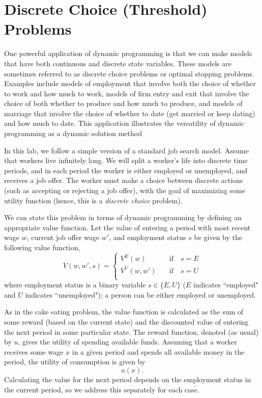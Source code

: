 \section*{Discrete Choice (Threshold) Problems}\label{SecDiscrChoice}

One powerful application of dynamic programming is that we can make 
models that have both continuous and discrete state variables. These models are sometimes referred to as
discrete choice problems or optimal stopping problems.  Examples include models of employment that involve both
the choice of whether to work and how much to work, models of firm entry and exit that involve the choice of both
whether to produce and how much to produce, and models of marriage that involve the choice of whether to date
(get married or keep dating) and how much to date.
This application illustrates the versatility of dynamic programming as a dynamic solution method

In this lab, we follow a simple version of a standard job search model.
Assume that workers live infinitely long.
We will split a worker's life into discrete time periods, and in each period the worker is either
employed or unemployed, and receives a job offer. The worker must make a choice between discrete actions
(such as accepting or rejecting a job offer), with the goal of maximizing some utility function (hence,
this is a \emph{discrete choice} problem).

We can state this problem in terms of dynamic programming by defining an appropriate value function.
Let the value of entering a period with most recent wage $w$,
current job offer wage $w'$, and employment status $s$ be given by the following value function,
\begin{equation}\label{EqV}
   V(w,w',s) = \begin{cases}
                  V^E(w)    \quad&\text{if}\quad s = E \\
                  V^U(w,w') \quad&\text{if}\quad s = U \\
               \end{cases}
\end{equation}
where employment status is a binary variable $s\in\{E,U\}$ ($E$ indicates ``employed" and $U$ indicates ``unemployed");
a person can be either employed or unemployed.

As in the cake eating problem, the value function is calculated as the sum of some reward (based on the
current state) and the discounted value of entering the next period in some particular state.
The reward function, denoted (as usual) by $u$, gives the utility of spending available funds.
Assuming that a worker receives some wage $x$ in a given period and spends all available money in the period,
the utility of consumption is given by
\[
u(x).
\]
Calculating the value for the next period depends on the employment status in the current period, so we address
this separately for each case.

